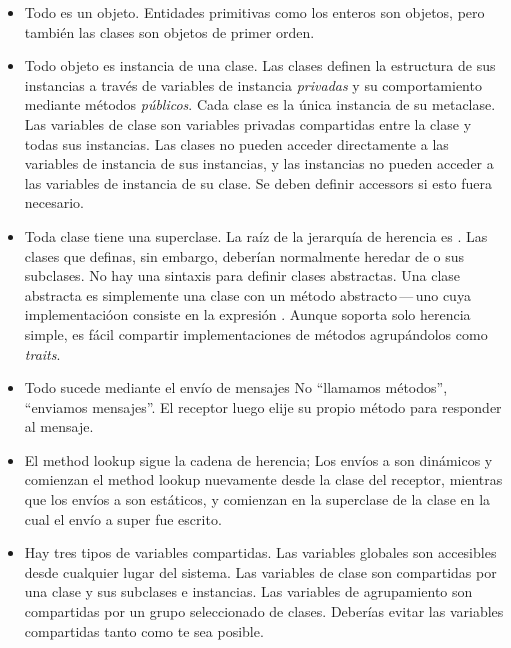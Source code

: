 \documentclass[a4paper,10pt,twoside]{book}
\begin{document}
\begin{itemize}
  \item Todo es un objeto.
  Entidades primitivas como los enteros son objetos, pero tambi\'en las clases son objetos de primer orden.

  \item Todo objeto es instancia de una clase.
  Las clases definen la estructura de sus instancias a trav\'es de variables de instancia \emph{privadas} y su comportamiento mediante m\'etodos \emph{p\'ublicos}. Cada clase es la \'unica instancia de su metaclase. Las variables de clase son variables privadas compartidas entre la clase y todas sus instancias.
  Las clases no pueden acceder directamente a las variables de instancia de sus instancias, y las instancias no pueden acceder a las variables de instancia de su clase. Se deben definir accessors si esto fuera necesario.

  \item Toda clase tiene una superclase.
  La ra\'iz de la jerarqu\'ia de herencia es .
  Las clases que definas, sin embargo, deber\'ian normalmente heredar de  o sus subclases.
  No hay una sintaxis para definir clases abstractas.
  Una clase abstracta es simplemente una clase con un m\'etodo abstracto\,---\,uno cuya implementaci\'oon consiste en la expresi\'on .
  Aunque \pharo soporta solo herencia simple, es f\'acil compartir implementaciones de m\'etodos agrup\'andolos como \emph{traits}.

  \item Todo sucede mediante el env\'io de mensajes
	No ``llamamos m\'etodos'', ``enviamos mensajes''.
	El receptor luego elije su propio m\'etodo para responder al mensaje.

  \item El method lookup sigue la cadena de herencia;
  Los env\'ios a \self son din\'amicos y comienzan el method lookup nuevamente desde la clase del receptor, mientras que
  los env\'ios a \super son est\'aticos, y comienzan en la superclase de la clase en la cual el env\'io a super fue escrito.
  
  \item Hay tres tipos de variables compartidas.
		Las variables globales son accesibles desde cualquier lugar del sistema.
		Las variables de clase son compartidas por una clase y sus subclases e instancias.
		Las variables de agrupamiento son compartidas por un grupo seleccionado de clases.
		Deber\'ias evitar las variables compartidas tanto como te sea posible.

\end{itemize}



\ifx\wholebook\relax\else
   
   
\end{document}
